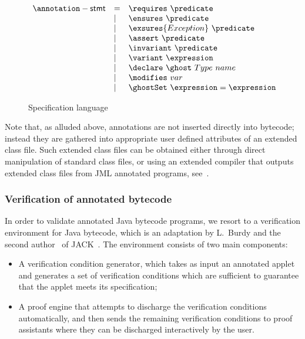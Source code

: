 \begin{figure}
$$
\begin{array}{lll} 
\mbox{\annotation}-{\sf stmt} & = &
                                       \requires \ \predicate \\
                              & \mid & \ensures  \ \predicate  \\
                           & \mid  & \exsures{Exception} \ \predicate  \\
                               & \mid  &  \assert  \ \predicate  \\
                                & \mid & \invariant \  \predicate  \\
                                & \mid & \variant \  \expression  \\
                                & \mid &  \declare \ \ghost \ Type \ name \\
                                 & \mid & \modifies  \ var  \\
                                 & \mid & \ghostSet \ \expression = \expression

\end{array}
$$
\caption{{\sc Specification language}}\label{fig:bml}
\end{figure}

Note that, as alluded above, annotations are not
inserted directly into bytecode; instead they are gathered into
appropriate user defined attributes of an extended class file. Such
extended class files can be obtained either through direct
manipulation of standard class files, or using an extended compiler
that outputs extended class files from JML annotated programs,
see~\cite{LM05:acc}.

\subsubsection{Verification of annotated bytecode}
In order to validate annotated Java bytecode programs, we resort to a
verification environment for Java bytecode, which is an adaptation by
L.~Burdy and the second author~\cite{LM05:acc} of
JACK~\cite{BRL-JACK}. The environment consists of two main
components:
\begin{itemize}
\item A verification condition generator, which takes as input an annotated
applet and generates a set of verification conditions which are sufficient
to guarantee that the applet meets its specification;

\item A proof engine that attempts to discharge the verification
conditions automatically, and then sends the remaining verification
conditions to proof assistants where they can be discharged
interactively by the user.

\end{itemize}


